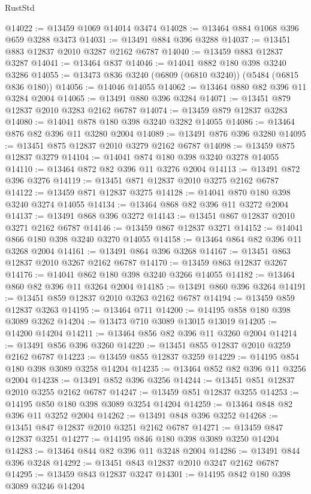 \begin{lexlean}{RustStd}
\begin{coremodule}
@14022 := @13459 @1069 @14014 @3474
@14028 := @13464 @884 @1068 @396 @659 @3288 @3473
@14031 := @13491 @884 @396 @3288
@14037 := @13451 @883 @12837 @2010 @3287 @2162 @6787
@14040 := @13459 @883 @12837 @3287
@14041 := @13464 @837
@14046 := @14041 @882 @180 @398 @3240 @3286
@14055 := @13473 @836 @3240 (@6809 (@6810 @3240)) (@5484 (@6815 @836 @180))
@14056 := @14046 @14055
@14062 := @13464 @880 @82 @396 @11 @3284 @2004
@14065 := @13491 @880 @396 @3284
@14071 := @13451 @879 @12837 @2010 @3283 @2162 @6787
@14074 := @13459 @879 @12837 @3283
@14080 := @14041 @878 @180 @398 @3240 @3282 @14055
@14086 := @13464 @876 @82 @396 @11 @3280 @2004
@14089 := @13491 @876 @396 @3280
@14095 := @13451 @875 @12837 @2010 @3279 @2162 @6787
@14098 := @13459 @875 @12837 @3279
@14104 := @14041 @874 @180 @398 @3240 @3278 @14055
@14110 := @13464 @872 @82 @396 @11 @3276 @2004
@14113 := @13491 @872 @396 @3276
@14119 := @13451 @871 @12837 @2010 @3275 @2162 @6787
@14122 := @13459 @871 @12837 @3275
@14128 := @14041 @870 @180 @398 @3240 @3274 @14055
@14134 := @13464 @868 @82 @396 @11 @3272 @2004
@14137 := @13491 @868 @396 @3272
@14143 := @13451 @867 @12837 @2010 @3271 @2162 @6787
@14146 := @13459 @867 @12837 @3271
@14152 := @14041 @866 @180 @398 @3240 @3270 @14055
@14158 := @13464 @864 @82 @396 @11 @3268 @2004
@14161 := @13491 @864 @396 @3268
@14167 := @13451 @863 @12837 @2010 @3267 @2162 @6787
@14170 := @13459 @863 @12837 @3267
@14176 := @14041 @862 @180 @398 @3240 @3266 @14055
@14182 := @13464 @860 @82 @396 @11 @3264 @2004
@14185 := @13491 @860 @396 @3264
@14191 := @13451 @859 @12837 @2010 @3263 @2162 @6787
@14194 := @13459 @859 @12837 @3263
@14195 := @13464 @711
@14200 := @14195 @858 @180 @398 @3089 @3262
@14204 := @13473 @710 @3089 @13015 @13019
@14205 := @14200 @14204
@14211 := @13464 @856 @82 @396 @11 @3260 @2004
@14214 := @13491 @856 @396 @3260
@14220 := @13451 @855 @12837 @2010 @3259 @2162 @6787
@14223 := @13459 @855 @12837 @3259
@14229 := @14195 @854 @180 @398 @3089 @3258 @14204
@14235 := @13464 @852 @82 @396 @11 @3256 @2004
@14238 := @13491 @852 @396 @3256
@14244 := @13451 @851 @12837 @2010 @3255 @2162 @6787
@14247 := @13459 @851 @12837 @3255
@14253 := @14195 @850 @180 @398 @3089 @3254 @14204
@14259 := @13464 @848 @82 @396 @11 @3252 @2004
@14262 := @13491 @848 @396 @3252
@14268 := @13451 @847 @12837 @2010 @3251 @2162 @6787
@14271 := @13459 @847 @12837 @3251
@14277 := @14195 @846 @180 @398 @3089 @3250 @14204
@14283 := @13464 @844 @82 @396 @11 @3248 @2004
@14286 := @13491 @844 @396 @3248
@14292 := @13451 @843 @12837 @2010 @3247 @2162 @6787
@14295 := @13459 @843 @12837 @3247
@14301 := @14195 @842 @180 @398 @3089 @3246 @14204

\end{coremodule}
\end{lexlean}
